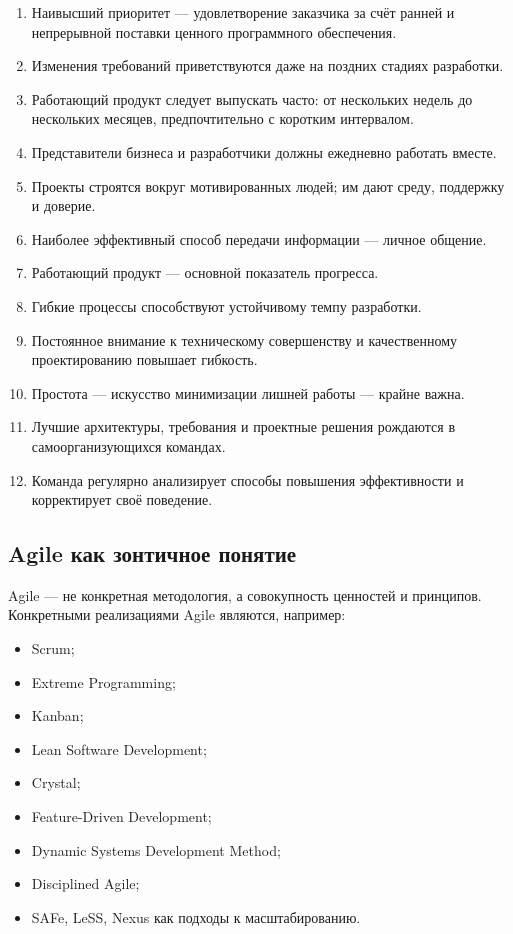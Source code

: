\documentclass[12pt,a4paper]{article}
\begin{document}
\begin{enumerate}
    \item Наивысший приоритет --- удовлетворение заказчика за счёт ранней и непрерывной поставки ценного программного обеспечения.
    \item Изменения требований приветствуются даже на поздних стадиях разработки.
    \item Работающий продукт следует выпускать часто: от нескольких недель до нескольких месяцев, предпочтительно с коротким интервалом.
    \item Представители бизнеса и разработчики должны ежедневно работать вместе.
    \item Проекты строятся вокруг мотивированных людей; им дают среду, поддержку и доверие.
    \item Наиболее эффективный способ передачи информации --- личное общение.
    \item Работающий продукт --- основной показатель прогресса.
    \item Гибкие процессы способствуют устойчивому темпу разработки.
    \item Постоянное внимание к техническому совершенству и качественному проектированию повышает гибкость.
    \item Простота --- искусство минимизации лишней работы --- крайне важна.
    \item Лучшие архитектуры, требования и проектные решения рождаются в самоорганизующихся командах.
    \item Команда регулярно анализирует способы повышения эффективности и корректирует своё поведение.
\end{enumerate}

\subsection{Agile как зонтичное понятие}

Agile --- не конкретная методология, а совокупность ценностей и принципов. Конкретными реализациями Agile являются, например:
\begin{itemize}
    \item Scrum;
    \item Extreme Programming;
    \item Kanban;
    \item Lean Software Development;
    \item Crystal;
    \item Feature-Driven Development;
    \item Dynamic Systems Development Method;
    \item Disciplined Agile;
    \item SAFe, LeSS, Nexus как подходы к масштабированию.
\end{itemize}
\end{document}
